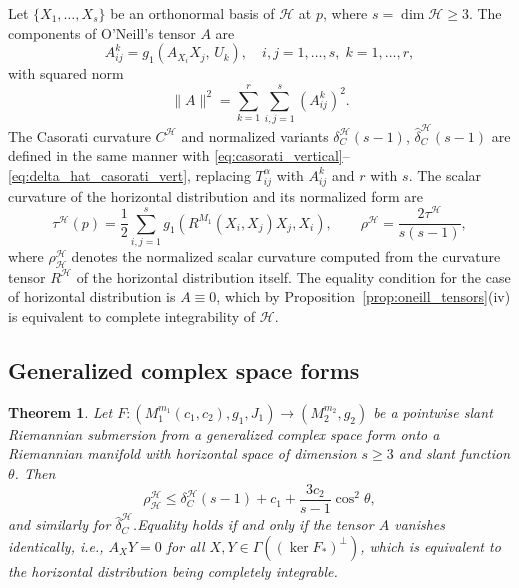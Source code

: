 \documentclass[11pt]{amsart}
\theoremstyle{plain}
\newtheorem{theorem}{Theorem}[section]
\theoremstyle{definition}
\theoremstyle{remark}
\newcommand{\calH}{\mathcal{H}}
\begin{document}
 Let 
$\{X_1,\ldots,X_s\}$ be an orthonormal basis of $\calH$ 
at $p$, where $s = \dim\calH \geq 3$. The components of 
O'Neill's tensor $A$ are
\begin{equation}\label{eq:A_components}
A_{ij}^{k} = g_1(A_{X_i}X_j,\, U_k), \quad 
i,j = 1,\ldots,s,\; k = 1,\ldots,r,
\end{equation}
with squared norm
\begin{equation}\label{eq:A_norm}
\|A\|^2 = \sum_{k=1}^{r}\sum_{i,j=1}^s 
           (A_{ij}^{k})^2.
\end{equation}
The Casorati curvature $C^{\calH}$ and normalized variants 
$\delta_C^{\calH}(s-1)$, $\hat{\delta}_C^{\calH}(s-1)$ 
are defined in the same manner with 
\eqref{eq:casorati_vertical}--\eqref{eq:delta_hat_casorati_vert}, 
replacing $T_{ij}^\alpha$ with $A_{ij}^k$ and $r$ with 
$s$. The scalar curvature of the horizontal distribution 
and its normalized form are
\begin{equation}\label{eq:normalized_scalar_horiz}
\tau^{\calH}(p) 
= \dfrac{1}{2}\sum_{i,j=1}^s 
  g_1(R^{M_1}(X_i,X_j)X_j,X_i), \qquad
\rho^{\calH} = \dfrac{2\tau^{\calH}}{s(s-1)},
\end{equation}
where $\rho_{\calH}^{\calH}$ denotes the normalized scalar 
curvature computed from the curvature tensor $R^{\calH}$ 
of the horizontal distribution itself. The equality 
condition for the case of horizontal distribution is $A \equiv 0$, 
which by Proposition~\ref{prop:oneill_tensors}(iv) is 
equivalent to complete integrability of $\calH$.

\subsection{Generalized complex space forms}


\begin{theorem}\label{thm:complex_subm_horiz}
Let $F:(M_1^{m_1}(c_1,c_2),g_1,J_1)\to (M_2^{m_2},g_2)$ be a pointwise slant Riemannian submersion from a generalized complex space form onto a Riemannian manifold with horizontal space of dimension $s\ge 3$ and slant function $\theta$. Then
\begin{equation}\label{eq:complex_horiz}
\rho_{\calH}^{\calH} \le \delta_C^{\calH}(s-1) + c_1 + \dfrac{3c_2}{s-1}\cos^2\theta,
\end{equation}
and similarly for $\hat{\delta}_C^{\calH}$.Equality holds if and only if the tensor $A$ vanishes identically, i.e., 
$A_XY = 0$ for all $X,Y \in \Gamma((\ker F_*)^\perp)$, which is equivalent 
to the horizontal distribution being completely integrable.
\end{theorem}
\end{document}

